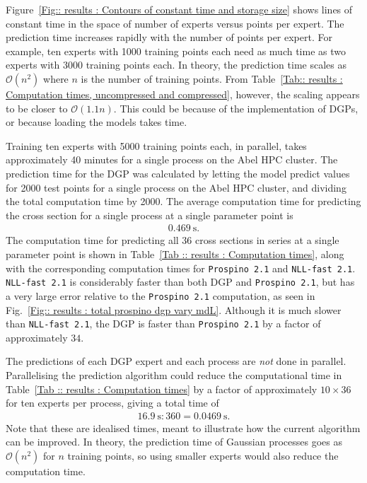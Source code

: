 \documentclass[twoside,english]{uiofysmaster}
\begin{document}
{{Figure~\ref{Fig:: results : Contours of constant time and storage size} shows lines of constant time in the space of number of experts versus points per expert. The prediction time increases rapidly with the number of points per expert. For example, ten experts with 1000 training points each need as much time as two experts with 3000 training points each. In theory, the prediction time scales as $\mathcal{O}(n^2)$ where $n$ is the number of training points. From Table~\ref{Tab:: results : Computation times, uncompressed and compressed}, however, the scaling appears to be closer to $\mathcal{O}(1.1 n)$. This could be because of the implementation of DGPs, or because loading the models takes time.

Training ten experts with 5000 training points each, in parallel, takes approximately 40 minutes for a single process on the Abel HPC cluster. The prediction time for the DGP was calculated by letting the model predict values for 2000 test points for a  single process on the Abel HPC cluster, and dividing the total computation time by 2000. The average computation time for predicting the cross section for a single process at a single parameter point is
\begin{align*}
0.469~\mathrm{s}.
\end{align*}
The computation time for predicting all 36 cross sections in series at a single parameter point is shown in Table~\ref{Tab :: results : Computation times}, along with the corresponding computation times for \verb|Prospino 2.1| and  \verb|NLL-fast 2.1|. \verb|NLL-fast 2.1| is considerably faster than both DGP and \verb|Prospino 2.1|, but has a very large error relative to the \verb|Prospino 2.1| computation, as seen in Fig.~\ref{Fig:: results : total prospino dgp vary mdL}. Although it is much slower than \verb|NLL-fast 2.1|, the DGP is faster than \verb|Prospino 2.1| by a factor of approximately $34$.

The predictions of each DGP expert and each process are \textit{not} done in parallel. Parallelising the prediction algorithm could reduce the computational time in Table~\ref{Tab :: results : Computation times} by a factor of approximately $10 \times 36$ for ten experts per process, giving a total time of
\begin{align*}
16.9~\mathrm{s} : 360 = 0.0469~\mathrm{s}.
\end{align*}
Note that these are idealised times, meant to illustrate how the current algorithm can be improved. In theory, the prediction time of Gaussian processes goes as $\mathcal{O}(n^2)$ for $n$ training points, so using smaller experts would also reduce the computation time.



}}
\end{document}
